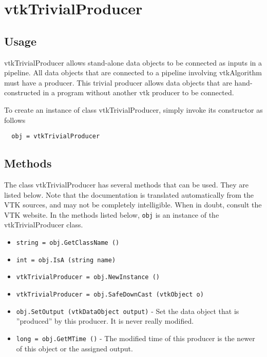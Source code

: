 \section{vtkTrivialProducer}

\subsection{Usage}

 vtkTrivialProducer allows stand-alone data objects to be connected
 as inputs in a pipeline.  All data objects that are connected to a
 pipeline involving vtkAlgorithm must have a producer.  This trivial
 producer allows data objects that are hand-constructed in a program
 without another vtk producer to be connected.

To create an instance of class vtkTrivialProducer, simply
invoke its constructor as follows
\begin{verbatim}
  obj = vtkTrivialProducer
\end{verbatim}
\subsection{Methods}

The class vtkTrivialProducer has several methods that can be used.
  They are listed below.
Note that the documentation is translated automatically from the VTK sources,
and may not be completely intelligible.  When in doubt, consult the VTK website.
In the methods listed below, \verb|obj| is an instance of the vtkTrivialProducer class.
\begin{itemize}
\item  \verb|string = obj.GetClassName ()|

\item  \verb|int = obj.IsA (string name)|

\item  \verb|vtkTrivialProducer = obj.NewInstance ()|

\item  \verb|vtkTrivialProducer = obj.SafeDownCast (vtkObject o)|

\item  \verb|obj.SetOutput (vtkDataObject output)| -  Set the data object that is ''produced'' by this producer.  It is
 never really modified.

\item  \verb|long = obj.GetMTime ()| -  The modified time of this producer is the newer of this object or
 the assigned output.

\end{itemize}
